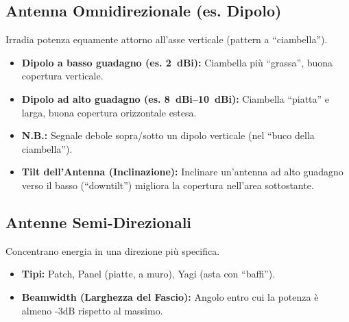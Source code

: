 \subsection{Antenna Omnidirezionale (es. Dipolo)}
Irradia potenza equamente attorno all'asse verticale (pattern a ``ciambella'').
\begin{itemize}
    \item \textbf{Dipolo a basso guadagno (es. \SI{2}{dBi}):} Ciambella più ``grassa'', buona copertura verticale.
    \item \textbf{Dipolo ad alto guadagno (es. \SIrange{8}{10}{dBi}):} Ciambella ``piatta'' e larga, buona copertura orizzontale estesa.
    \item \textbf{N.B.:} Segnale debole sopra/sotto un dipolo verticale (nel ``buco della ciambella'').
    \item \textbf{Tilt dell'Antenna (Inclinazione):} Inclinare un'antenna ad alto guadagno verso il basso (``downtilt'') migliora la copertura nell'area sottostante.
\end{itemize}
\begin{center}
\end{center}

\subsection{Antenne Semi-Direzionali}
Concentrano energia in una direzione più specifica.
\begin{itemize}
    \item \textbf{Tipi:} Patch, Panel (piatte, a muro), Yagi (asta con ``baffi'').
    \item \textbf{Beamwidth (Larghezza del Fascio):} Angolo entro cui la potenza è almeno -3dB rispetto al massimo.
\end{itemize}


